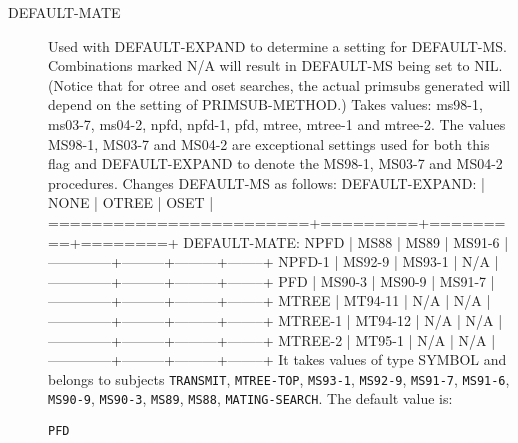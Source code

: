 \begin{description}
\item[DEFAULT-MATE]  
Used with DEFAULT-EXPAND to determine a setting for DEFAULT-MS.
Combinations marked N/A will result in DEFAULT-MS being set to NIL.
(Notice that for otree and oset searches, the actual primsubs generated will
depend on the setting of PRIMSUB-METHOD.)
Takes values: ms98-1, ms03-7, ms04-2, npfd, npfd-1, pfd, mtree, mtree-1 and mtree-2.
The values MS98-1, MS03-7 and MS04-2 are exceptional settings used for both this flag and 
DEFAULT-EXPAND to denote the MS98-1, MS03-7 and MS04-2 procedures.
Changes DEFAULT-MS as follows:
        DEFAULT-EXPAND:        |  NONE   |  OTREE  |  OSET  |
       ========================+=========+=========+========+
DEFAULT-MATE:          NPFD    |  MS88   |   MS89  | MS91-6 |
                 --------------+---------+---------+--------+
                      NPFD-1   | MS92-9  |  MS93-1 |  N/A   |
                 --------------+---------+---------+--------+
                        PFD    | MS90-3  |  MS90-9 | MS91-7 |
                 --------------+---------+---------+--------+
                      MTREE    | MT94-11 |   N/A   |  N/A   |
                 --------------+---------+---------+--------+
                     MTREE-1   | MT94-12 |   N/A   |  N/A   |
                 --------------+---------+---------+--------+
                     MTREE-2   | MT95-1  |   N/A   |  N/A   |
                 --------------+---------+---------+--------+
It takes values of type SYMBOL and belongs to subjects \texttt{TRANSMIT}, \texttt{MTREE-TOP}, \texttt{MS93-1}, \texttt{MS92-9}, \texttt{MS91-7}, \texttt{MS91-6}, \texttt{MS90-9}, \texttt{MS90-3}, \texttt{MS89}, \texttt{MS88}, \texttt{MATING-SEARCH}.  The default value is: \begin{lstlisting}
PFD
\end{lstlisting}


\end{description}
